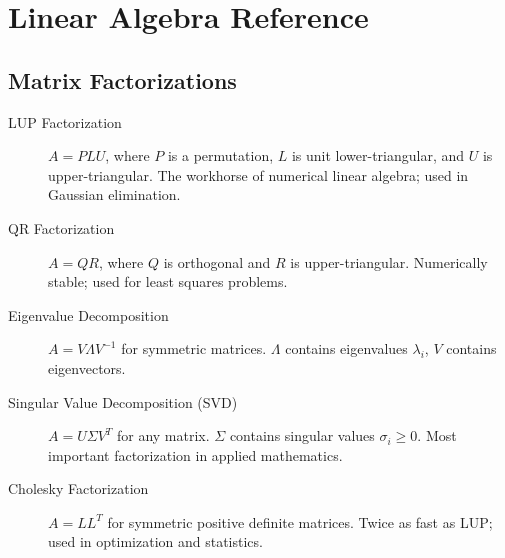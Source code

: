 \chapter{Linear Algebra Reference}
\label{app:linalg}

\begin{abstract}
This appendix summarizes the linear algebra concepts used throughout this book. It covers matrix factorizations, eigenvalue theory, singular value decomposition, and numerical stability---the mathematical foundations underlying every chapter.
\end{abstract}

\section{Matrix Factorizations}
\label{app:linalg:fact}

\begin{description}
    \item[LUP Factorization] $A = PLU$, where $P$ is a permutation, $L$ is unit lower-triangular, and $U$ is upper-triangular. The workhorse of numerical linear algebra; used in Gaussian elimination.

    \item[QR Factorization] $A = QR$, where $Q$ is orthogonal and $R$ is upper-triangular. Numerically stable; used for least squares problems.

    \item[Eigenvalue Decomposition] $A = V\Lambda V^{-1}$ for symmetric matrices. $\Lambda$ contains eigenvalues $\lambda_i$, $V$ contains eigenvectors.

    \item[Singular Value Decomposition (SVD)] $A = U\Sigma V^T$ for any matrix. $\Sigma$ contains singular values $\sigma_i \geq 0$. Most important factorization in applied mathematics.

    \item[Cholesky Factorization] $A = LL^T$ for symmetric positive definite matrices. Twice as fast as LUP; used in optimization and statistics.
\end{description}

